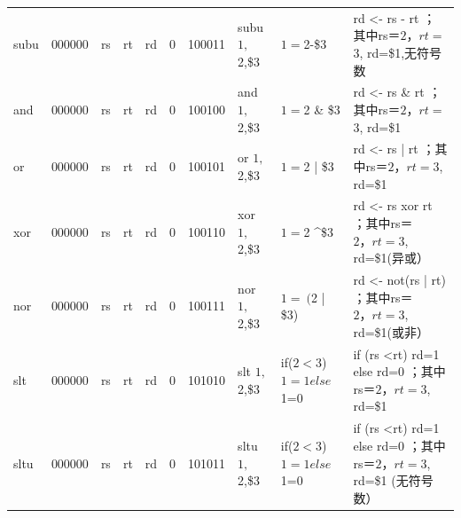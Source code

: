 \documentclass[12pt,a4paper]{article}
\begin{document}
\begin{landscape}
\begin{table}[]
{\begin{tabular}{llllllllll}
subu   & 000000 & rs     & rt     & rd        & 0     & 100011 & subu $1,$2,\$3  & $1=$2-\$3                            & rd \textless{}- rs - rt   ；其中rs＝$2，rt=$3,   rd=\$1,无符号数                                                                                                                                                                                 \\
and    & 000000 & rs     & rt     & rd        & 0     & 100100 & and $1,$2,\$3   & $1=$2 \& \$3                         & rd \textless{}- rs \& rt   ；其中rs＝$2，rt=$3,   rd=\$1                                                                                                                                                                                     \\
or     & 000000 & rs     & rt     & rd        & 0     & 100101 & or $1,$2,\$3    & $1=$2 | \$3                          & rd \textless{}- rs | rt   ；其中rs＝$2，rt=$3, rd=\$1                                                                                                                                                                                        \\
xor    & 000000 & rs     & rt     & rd        & 0     & 100110 & xor $1,$2,\$3   & $1=$2 \textasciicircum \$3           & rd \textless{}- rs xor rt   ；其中rs＝$2，rt=$3,   rd=\$1(异或）                                                                                                                                                                                \\
nor    & 000000 & rs     & rt     & rd        & 0     & 100111 & nor $1,$2,\$3   & $1=~($2 | \$3)                       & rd \textless{}- not(rs | rt)   ；其中rs＝$2，rt=$3,   rd=\$1(或非）                                                                                                                                                                             \\
slt    & 000000 & rs     & rt     & rd        & 0     & 101010 & slt $1,$2,\$3   & if($2<$3)   $1=1 else      $1=0      & if (rs \textless rt) rd=1 else rd=0 ；其中rs＝$2，rt=$3,   rd=\$1                                                                                                                                                                            \\
sltu   & 000000 & rs     & rt     & rd        & 0     & 101011 & sltu $1,$2,\$3  & if($2<$3)   $1=1 else      $1=0      & if (rs \textless rt) rd=1 else rd=0 ；其中rs＝$2，rt=$3,   rd=\$1  (无符号数）                                                                                                                                                                    \\

\end{tabular}}
\end{table}
\end{landscape}
\end{document}
